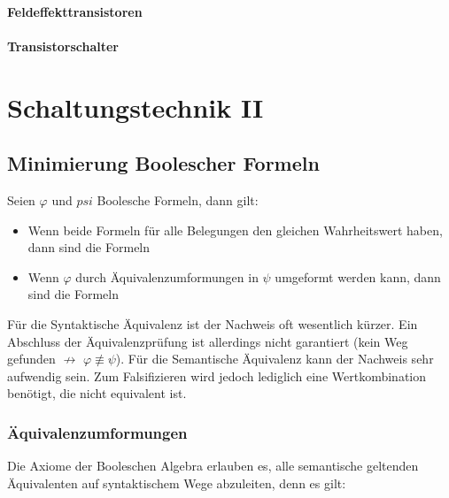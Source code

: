 \documentclass[12pt]{report}
\begin{document}
\subsubsection{Feldeffekttransistoren}

\subsubsection{Transistorschalter}




\chapter{Schaltungstechnik II}
\section{Minimierung Boolescher Formeln}
\begin{defbox}
  Seien $\varphi$ und $psi$ Boolesche Formeln, dann gilt:
  
  \begin{itemize}
    \item Wenn beide Formeln für alle Belegungen den gleichen Wahrheitswert haben, dann sind die Formeln
          
          
          
    \item Wenn $\varphi$ durch Äquivalenzumformungen in $\psi$ umgeformt werden kann, dann sind die Formeln
          
  \end{itemize}
\end{defbox}

Für die Syntaktische Äquivalenz ist der Nachweis oft wesentlich kürzer. Ein Abschluss der Äquivalenzprüfung ist allerdings nicht garantiert (kein Weg gefunden $\not \rightarrow$ $\varphi \not \equiv \psi$).
Für die Semantische Äquivalenz kann der Nachweis sehr aufwendig sein. Zum Falsifizieren wird jedoch lediglich eine Wertkombination benötigt, die nicht equivalent ist.

\subsection{Äquivalenzumformungen}
Die Axiome der Booleschen Algebra erlauben es, alle semantische geltenden Äquivalenten auf syntaktischem Wege abzuleiten, denn es gilt:
\end{document}
